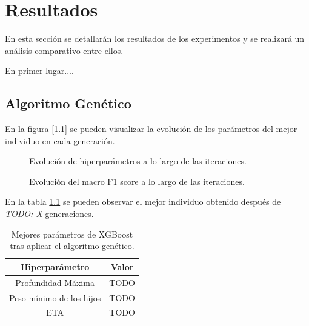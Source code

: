 
\chapter{Resultados}
\label{resultados}



  En esta sección se detallarán los resultados de los experimentos y se realizará un análisis comparativo entre ellos.


  En primer lugar....

\section{Algoritmo Genético}

  En la figura [\ref{EvolucionHiperparametrosImage}] se pueden visualizar la evolución de los parámetros del mejor individuo en cada generación.

  \begin{figure}[H]
      \centering
      
      \caption{Evolución de hiperparámetros a lo largo de las iteraciones.}
      \label{EvolucionHiperparametrosImage}
   \end{figure}

  \begin{figure}[H]
      \centering
      
      \caption{Evolución del macro F1 score a lo largo de las iteraciones.}
      \label{EvolucionF1ScoreImage}
   \end{figure}

  En la tabla \ref{BestGASolutionTable} se pueden observar el mejor individuo obtenido después de \textit{TODO: X} generaciones.

  \begin{table}[H]
      \centering
          \begin{tabular}{ |c|c| } 
              \hline
              \textbf{Hiperparámetro} & \textbf{Valor}\\
              \hline
                  Profundidad Máxima & TODO \\ 
                  Peso mínimo de los hijos & TODO \\ 
                  ETA & TODO \\ 
              \hline

          \end{tabular}
      \caption{Mejores parámetros de XGBoost tras aplicar el algoritmo genético.}
      \label{BestGASolutionTable}
  \end{table}

